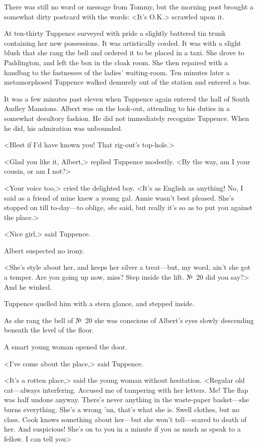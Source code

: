 There was still no word or message from Tommy, but the morning post brought a somewhat dirty postcard with the words: <It's O.K.> scrawled upon it.

At ten-thirty Tuppence surveyed with pride a slightly battered tin trunk containing her new possessions. It was artistically corded. It was with a slight blush that she rang the bell and ordered it to be placed in a taxi. She drove to Paddington, and left the box in the cloak room. She then repaired with a handbag to the fastnesses of the ladies' waiting-room. Ten minutes later a metamorphosed Tuppence walked demurely out of the station and entered a bus.

It was a few minutes past eleven when Tuppence again entered the hall of South Audley Mansions. Albert was on the look-out, attending to his duties in a somewhat desultory fashion. He did not immediately recognize Tuppence. When he did, his admiration was unbounded.

<Blest if I'd have known you! That rig-out's top-hole.>

<Glad you like it, Albert,> replied Tuppence modestly. <By the way, am I your cousin, or am I not?>

<Your voice too,> cried the delighted boy. <It's as English as anything! No, I said as a friend of mine knew a young gal. Annie wasn't best pleased. She's stopped on till to-day—to oblige, \emph{she} said, but really it's so as to put you against the place.>

<Nice girl,> said Tuppence.

Albert suspected no irony.

<She's style about her, and keeps her silver a treat—but, my word, ain't she got a temper. Are you going up now, miss? Step inside the lift. №~20 did you say?> And he winked.

Tuppence quelled him with a stern glance, and stepped inside.

As she rang the bell of №~20 she was conscious of Albert's eyes slowly descending beneath the level of the floor.

A smart young woman opened the door.

<I've come about the place,> said Tuppence.

<It's a rotten place,> said the young woman without hesitation. <Regular old cat—always interfering. Accused me of tampering with her letters. Me! The flap was half undone anyway. There's never anything in the waste-paper basket—she burns everything. She's a wrong 'un, that's what she is. Swell clothes, but no class. Cook knows something about her—but she won't tell—scared to death of her. And suspicious! She's on to you in a minute if you as much as speak to a fellow. I can tell you\longdash>

